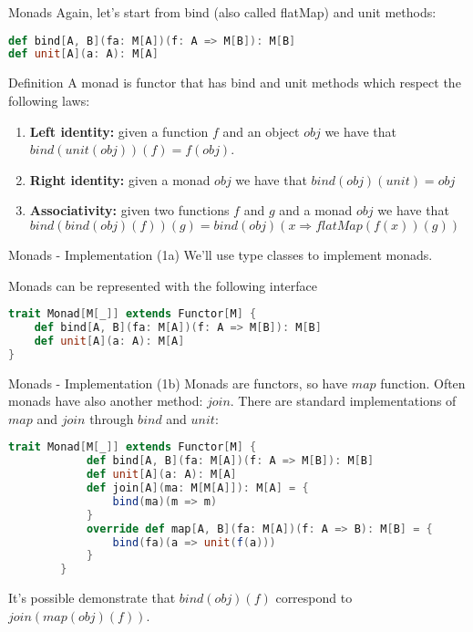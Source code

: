 \begin{frame}[fragile]{Monads}
	Again, let's start from bind (also called flatMap) and unit methods:
\begin{lstlisting}[language=scala]
def bind[A, B](fa: M[A])(f: A => M[B]): M[B]
def unit[A](a: A): M[A]
\end{lstlisting}
	\pause
	\begin{block}{Definition}
		A monad is functor that has bind and unit methods which respect the following laws:
		\begin{enumerate}[<+->]
			\item \textbf{Left identity:}  given a function $f$ and an object $obj$ we have that $bind(unit(obj))(f) = f(obj)$.
			\item \textbf{Right identity:} given a monad $obj$ we have that $bind(obj)(unit) = obj$
			\item \textbf{Associativity:} given two functions $f$ and $g$ and a monad $obj$ we have that 
			$bind(bind(obj)(f))(g) = bind(obj)(x \Rightarrow flatMap(f(x))(g))$
		\end{enumerate}
	\end{block}
\end{frame}

\begin{frame}[fragile]{Monads - Implementation (1a)}	
	We'll use type classes to implement monads.
	
	Monads can be represented with the following interface
\begin{lstlisting}[language=scala]
trait Monad[M[_]] extends Functor[M] {
	def bind[A, B](fa: M[A])(f: A => M[B]): M[B]
	def unit[A](a: A): M[A]
}			
\end{lstlisting}
\end{frame}

\begin{frame}[fragile]{Monads - Implementation (1b)}	
	Monads are functors, so have $map$ function.
	Often monads have also another method: $join$.
	There are standard implementations of $map$ and $join$ through $bind$ and $unit$:
	\begin{lstlisting}[language=scala]
		trait Monad[M[_]] extends Functor[M] {
			def bind[A, B](fa: M[A])(f: A => M[B]): M[B]
			def unit[A](a: A): M[A]
			def join[A](ma: M[M[A]]): M[A] = { 
				bind(ma)(m => m)
			}
			override def map[A, B](fa: M[A])(f: A => B): M[B] = {
				bind(fa)(a => unit(f(a)))
			}
		}			
	\end{lstlisting}
	It's possible demonstrate that $bind(obj)(f)$ correspond to $join(map(obj)(f))$.
\end{frame}

